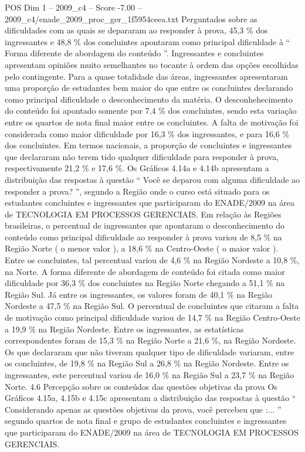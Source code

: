 \begin{textsample}{POS Dim 1 – 2009\_c4 – Score -7.00 – 2009\_c4/enade\_2009\_proc\_ger\_1f5954ceea.txt}
Perguntados sobre as dificuldades com as quais se depararam ao responder à prova, 45,3 \% dos ingressantes e 48,8 \% dos concluintes apontaram como principal dificuldade à “ Forma diferente de abordagem do conteúdo ”.
Ingressantes e concluintes apresentam opiniões muito semelhantes no tocante à ordem das opções escolhidas pelo contingente.
Para a quase totalidade das áreas, ingressantes apresentaram uma proporção de estudantes bem maior do que entre os concluintes declarando como principal dificuldade o desconhecimento da matéria.
O desconhehecimento do conteúdo foi apontado somente por 7,4 \% dos concluintes, sendo esta variação entre os quartos de nota final maior entre os concluintes.
A falta de motivação foi considerada como maior dificuldade por 16,3 \% dos ingressantes, e para 16,6 \% dos concluintes.
Em termos nacionais, a proporção de concluintes e ingressantes que declararam não terem tido qualquer dificuldade para responder à prova, respectivamente 21,2 \% e 17,6 \%.
Os Gráficos 4.14a e 4.14b apresentam a distribuição das respostas à questão “ Você se deparou com alguma dificuldade ao responder a prova? ”, segundo a Região onde o curso está situado para os estudantes concluintes e ingressantes que participaram do ENADE/2009 na área de TECNOLOGIA EM PROCESSOS GERENCIAIS.
Em relação às Regiões brasileiras, o percentual de ingressantes que apontaram o desconhecimento do conteúdo como principal dificuldade ao responder à prova variou de 8,5 \% na Região Norte ( o menor valor ), a 18,6 \% na Centro-Oeste ( o maior valor ).
Entre os concluintes, tal percentual variou de 4,6 \% na Região Nordeste a 10,8 \%, na Norte.
A forma diferente de abordagem de conteúdo foi citada como maior dificuldade por 36,3 \% dos concluintes na Região Norte chegando a 51,1 \% na Região Sul.
Já entre os ingressantes, os valores foram de 40,1 \% na Região Nordeste a 47,5 \% na Região Sul.
O percentual de concluintes que citaram a falta de motivação como principal dificuldade variou de 14,7 \% na Região Centro-Oeste a 19,9 \% na Região Nordeste.
Entre os ingressantes, as estatísticas correspondentes foram de 15,3 \% na Região Norte a 21,6 \%, na Região Nordeste.
Os que declararam que não tiveram qualquer tipo de dificuldade variaram, entre os concluintes, de 19,8 \% na Região Sul a 26,8 \% na Região Nordeste.
Entre os ingressantes, este percentual variou de 16,0 \% na Região Sul a 23,7 \% na Região Norte. 4.6 Percepção sobre os conteúdos das questões objetivas da prova Os Gráficos 4.15a, 4.15b e 4.15c apresentam a distribuição das respostas à questão “ Considerando apenas as questões objetivas da prova, você percebeu que :... ” segundo quartos de nota final e grupo de estudantes concluintes e ingressantes que participaram do ENADE/2009 na área de TECNOLOGIA EM PROCESSOS GERENCIAIS.

\end{textsample}
